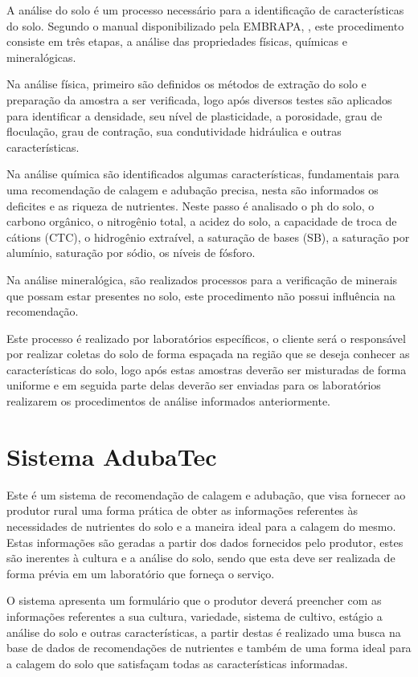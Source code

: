 \documentclass[
12pt,				%
oneside,			%
a4paper,			%
english,			%
french,				%
spanish,			%
brazil				%
]{abntex2}
\begin{document}
A análise do solo é um processo necessário para a identificação de características do solo. Segundo o manual disponibilizado pela EMBRAPA, \cite{claessen1997manual}, este procedimento consiste em três etapas, a análise das propriedades físicas, químicas e mineralógicas.

Na análise física, primeiro são definidos os métodos de extração do solo e preparação da amostra a ser verificada, logo após diversos testes são aplicados para identificar a densidade, seu nível de plasticidade, a porosidade, grau de floculação, grau de contração, sua condutividade hidráulica e outras características. 

Na análise química são identificados algumas características, fundamentais para uma recomendação de calagem e adubação precisa, nesta são informados os deficites e as riqueza de nutrientes. Neste passo é analisado o ph do solo, o carbono orgânico, o nitrogênio total, a acidez do solo, a capacidade de troca de cátions (CTC), o hidrogênio extraível, a saturação de bases (SB), a saturação por alumínio, saturação por sódio, os níveis de fósforo.

Na análise mineralógica, são realizados processos para a verificação de minerais que possam estar presentes no solo, este procedimento não possui influência na recomendação.      

Este processo é realizado por laboratórios específicos, o cliente será o responsável por realizar coletas do solo de forma espaçada na região que se deseja conhecer as características do solo, logo após estas amostras deverão ser misturadas de forma uniforme e em seguida parte delas deverão ser enviadas para os laboratórios realizarem os procedimentos de análise informados anteriormente.    




\chapter{Sistema AdubaTec}

Este é um sistema de recomendação de calagem e adubação, que visa fornecer ao produtor rural uma forma prática de obter as informações referentes às necessidades de nutrientes do solo e a maneira ideal para a calagem do mesmo. Estas informações são geradas a partir dos dados fornecidos pelo produtor, estes são inerentes à cultura e a análise do solo, sendo que esta deve ser realizada de forma prévia em um laboratório que forneça o serviço.\cite{adubatec}

O sistema apresenta um formulário que o produtor deverá preencher com as informações referentes a sua cultura, variedade, sistema de cultivo, estágio a análise do solo e outras características, a partir destas é realizado uma busca na base de dados de recomendações de nutrientes e também de uma forma ideal para a calagem do solo que satisfaçam todas as características informadas.
\end{document}
